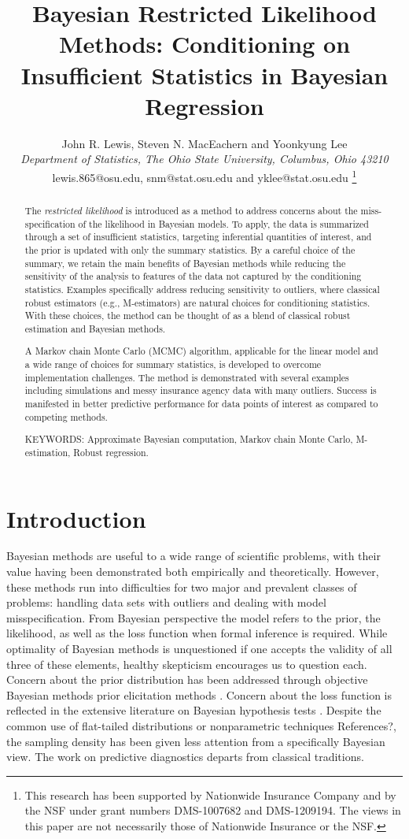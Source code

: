 \documentclass[11pt]{article}
\title{Bayesian Restricted Likelihood Methods: Conditioning on Insufficient Statistics in Bayesian Regression}
\author{John R. Lewis, Steven N. MacEachern and  Yoonkyung Lee \\
{\small \it Department of Statistics, The Ohio State University, Columbus, Ohio 43210}\\
{\small lewis.865@osu.edu, snm@stat.osu.edu and yklee@stat.osu.edu}
\thanks{This research has been supported by Nationwide Insurance Company and by the NSF under grant numbers DMS-1007682 and DMS-1209194.  The views in this paper are not necessarily those of Nationwide Insurance or the NSF.}}
\newcommand{\red}[1]{{\color{red}#1}}
\begin{document}
\date{}
\maketitle

\begin{abstract}
The \textit{restricted likelihood} is introduced as a method to address concerns about the miss-specification of the likelihood in Bayesian models. To apply, the data is summarized through a set of insufficient statistics,
targeting inferential quantities of interest, and the prior is updated with only the summary statistics. By a careful choice of the summary, we retain the main benefits of Bayesian methods while reducing the
sensitivity of the analysis to features of the data not captured by
the conditioning statistics. Examples specifically address reducing sensitivity to outliers,
where classical robust estimators (e.g., M-estimators) are natural choices
for conditioning statistics. With these choices, the method can be thought of as a blend of classical robust estimation and Bayesian methods. 

A Markov chain Monte Carlo (MCMC) algorithm, applicable for the linear model and a wide range of choices for
summary statistics, is developed to overcome implementation challenges. The method is demonstrated with several examples including simulations and messy insurance agency data with many outliers. Success is manifested in better predictive
performance for data points of interest as compared to competing methods.

\noindent KEYWORDS: Approximate Bayesian computation, Markov chain
Monte Carlo, M-estimation, Robust regression.


\end{abstract}

\section{Introduction}
Bayesian methods are useful to a wide range of scientific problems, with their value
having been demonstrated both empirically and theoretically. However, these methods run into difficulties
for two major and prevalent classes of problems: handling data sets
with outliers and dealing with model misspecification. From Bayesian perspective the model refers to the prior, the likelihood, as well as the loss function when formal inference is required. While optimality of Bayesian methods is unquestioned if one accepts the validity of all three of these elements, healthy skepticism encourages us to question each.  Concern about the prior distribution has
been addressed through objective Bayesian methods \citep{berger2006} prior elicitation methods \citep{garthwaite2005, ohagan2006}. Concern about the loss function is reflected in the extensive literature on Bayesian hypothesis tests \citep{kass1995}.  Despite the common use of flat-tailed distributions \citep{berger1994} or nonparametric techniques \red{References?}, the sampling density has been given less attention from a specifically Bayesian view. The work on predictive diagnostics \citep{box1980} departs from classical
traditions.  
\end{document}
